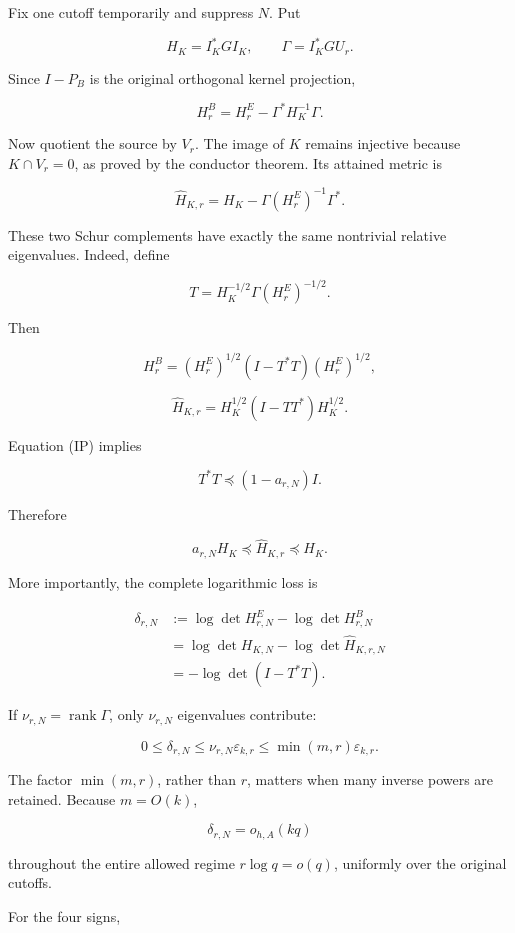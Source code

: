 \documentclass[11pt]{article}
\begin{document}
Fix one cutoff temporarily and suppress \(N\). Put

\[
H_K=I_K^*GI_K,\qquad
\Gamma=I_K^*GU_r.
\]

Since \(I-P_B\) is the original orthogonal kernel projection,

\[
\boxed{
H^B_r=H^E_r-\Gamma^*H_K^{-1}\Gamma.
}
\tag{3}
\]

Now quotient the source by \(V_r\). The image of \(K\) remains injective because \(K\cap V_r=0\), as proved by the conductor theorem. Its attained metric is

\[
\boxed{
\widehat H_{K,r}
=
H_K-\Gamma(H^E_r)^{-1}\Gamma^*.
}
\tag{4}
\]

These two Schur complements have exactly the same nontrivial relative eigenvalues. Indeed, define

\[
T=H_K^{-1/2}\Gamma(H^E_r)^{-1/2}.
\]

Then

\[
H^B_r=(H^E_r)^{1/2}(I-T^*T)(H^E_r)^{1/2},
\]

\[
\widehat H_{K,r}=H_K^{1/2}(I-TT^*)H_K^{1/2}.
\]

Equation (IP) implies

\[
T^*T\preceq(1-a_{r,N})I.
\]

Therefore

\[
\boxed{
a_{r,N}H_K\preceq\widehat H_{K,r}\preceq H_K.
}
\tag{5}
\]

More importantly, the complete logarithmic loss is

\[
\boxed{
\begin{aligned}
\delta_{r,N}
&:=\log\det H^E_{r,N}-\log\det H^B_{r,N}\\
&=\log\det H_{K,N}-\log\det\widehat H_{K,r,N}\\
&=-\log\det(I-T^*T).
\end{aligned}
}
\tag{6}
\]

If \(\nu_{r,N}=\operatorname{rank}\Gamma\), only \(\nu_{r,N}\) eigenvalues contribute:

\[
\boxed{
0\le\delta_{r,N}
\le \nu_{r,N}\varepsilon_{k,r}
\le\min(m,r)\varepsilon_{k,r}.
}
\tag{7}
\]

The factor \(\min(m,r)\), rather than \(r\), matters when many inverse powers are retained. Because \(m=O(k)\),

\[
\boxed{
\delta_{r,N}=o_{h,A}(kq)
}
\tag{8}
\]

throughout the entire allowed regime \(r\log q=o(q)\), uniformly over the original cutoffs.

For the four signs,
\end{document}
